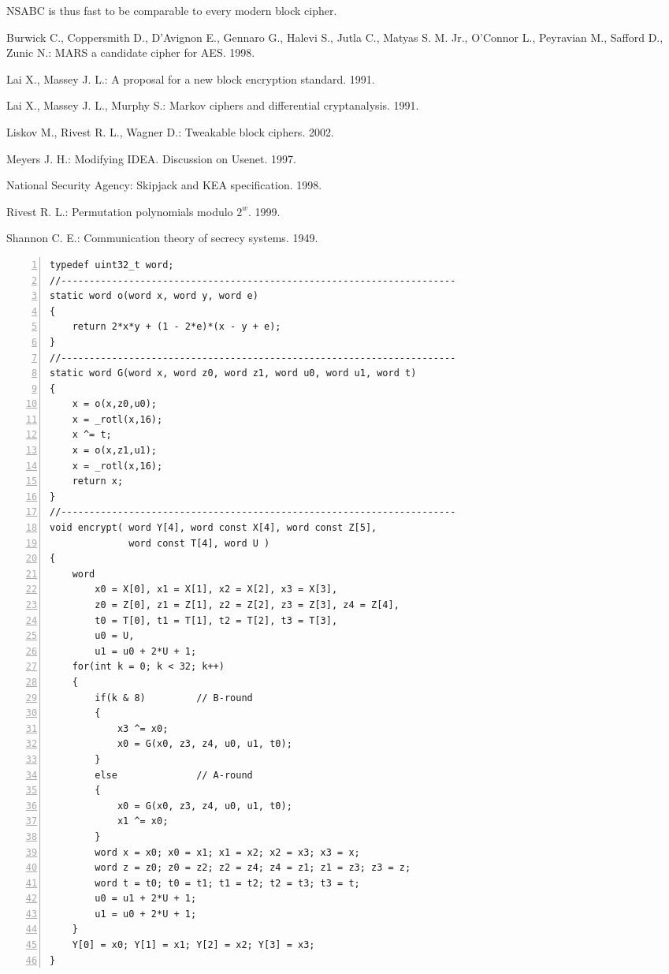 \documentclass[a4paper,oneside,english]{amsart}
\numberwithin{equation}{section}
\numberwithin{figure}{section}
\begin{document}
NSABC is thus fast to be comparable to every modern block cipher.
\begin{thebibliography}{References}
Burwick C., Coppersmith D., D'Avignon E., Gennaro
G., Halevi S., Jutla C., Matyas S. M. Jr., O'Connor L., Peyravian
M., Safford D., Zunic N.: MARS \textemdash{} a candidate cipher for
AES. 1998.

Lai X., Massey J. L.: A proposal for a new block
encryption standard. 1991.

Lai X., Massey J. L., Murphy S.: Markov ciphers
and differential cryptanalysis. 1991.

Liskov M., Rivest R. L., Wagner D.: Tweakable
block ciphers. 2002.

Meyers J. H.: Modifying IDEA. Discussion on
Usenet. 1997.

National Security Agency: Skipjack and KEA
specification. 1998.

Rivest R. L.: Permutation polynomials modulo
$2^{w}$. 1999.

Shannon C. E.: Communication theory of secrecy
systems. 1949.

\end{thebibliography}


\begin{lstlisting}[basicstyle={\scriptsize\ttfamily},numbers=left,numberstyle={\footnotesize},tabsize=4]
typedef uint32_t word; 
//----------------------------------------------------------------------
static word o(word x, word y, word e)
{
    return 2*x*y + (1 - 2*e)*(x - y + e);
}
//----------------------------------------------------------------------
static word G(word x, word z0, word z1, word u0, word u1, word t)
{   
    x = o(x,z0,u0);
    x = _rotl(x,16);
    x ^= t;
    x = o(x,z1,u1);
    x = _rotl(x,16);
    return x;
}
//----------------------------------------------------------------------
void encrypt( word Y[4], word const X[4], word const Z[5], 
              word const T[4], word U )
{
    word
        x0 = X[0], x1 = X[1], x2 = X[2], x3 = X[3],
        z0 = Z[0], z1 = Z[1], z2 = Z[2], z3 = Z[3], z4 = Z[4],
        t0 = T[0], t1 = T[1], t2 = T[2], t3 = T[3], 
        u0 = U,
        u1 = u0 + 2*U + 1;
    for(int k = 0; k < 32; k++)
    {
        if(k & 8)         // B-round
        {
            x3 ^= x0;
            x0 = G(x0, z3, z4, u0, u1, t0);
        }
        else              // A-round
        {
            x0 = G(x0, z3, z4, u0, u1, t0);
            x1 ^= x0;
        }
        word x = x0; x0 = x1; x1 = x2; x2 = x3; x3 = x;
        word z = z0; z0 = z2; z2 = z4; z4 = z1; z1 = z3; z3 = z;
        word t = t0; t0 = t1; t1 = t2; t2 = t3; t3 = t;
        u0 = u1 + 2*U + 1;
        u1 = u0 + 2*U + 1;
    }
    Y[0] = x0; Y[1] = x1; Y[2] = x2; Y[3] = x3;
}
\end{lstlisting}
\end{document}
